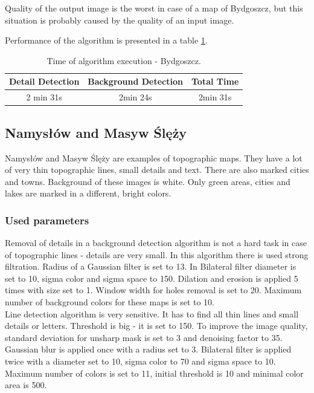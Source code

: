 \documentclass[a4paper,onecolumn,oneside,12pt]{memoir}
\begin{document}
Quality of the output image is the worst in case of a map of Bydgoszcz, but this situation is
probably caused by the quality of an input image.

Performance of the algorithm is presented in a table \ref{bydgoszczPerformance}.

\begin{table}[!ht]
\begin{center}
\caption{Time of algorithm execution - Bydgoszcz.}
\label{bydgoszczPerformance}
\begin{tabular}{|c|c|c|}
  \hline
  Detail Detection & Background Detection & Total Time \\
  \hline
  2 min 31s & 2min 24s & 2min 31s \\
  \hline
\end{tabular}
\end{center}
\end{table}

\subsection{Namysłów and Masyw Ślęży}

Namysłów and Masyw Ślęży are examples of topographic maps. They have a lot of very thin topographic
lines, small details and text. There are also marked cities and towns. Background of these images is
white. Only green areas, cities and lakes are marked in a different, bright colors.

\subsubsection{Used parameters}

Removal of details in a background detection algorithm is not a hard task in case of topographic
lines - details are very small. In this algorithm there is used strong filtration. Radius of a
Gaussian filter is set to 13. In Bilateral filter diameter is set to 10, sigma color and sigma
space to 150. Dilation and erosion is applied 5 times with size set to 1. Window width for holes
removal is set to 20. Maximum number of background colors for these maps is set to 10. \\

Line detection algorithm is very sensitive. It has to find all thin lines and small details or
letters. Threshold is big - it is set to 150. To improve the image quality, standard deviation for
unsharp mask is set to 3 and denoising factor to 35. Gaussian blur is applied once with a radius
set to 3. Bilateral filter is applied twice with a diameter set to 10, sigma color to 70 and sigma
space to 10. Maximum number of colors is set to 11, initial threshold is 10 and minimal color area
is 500.
\end{document}
